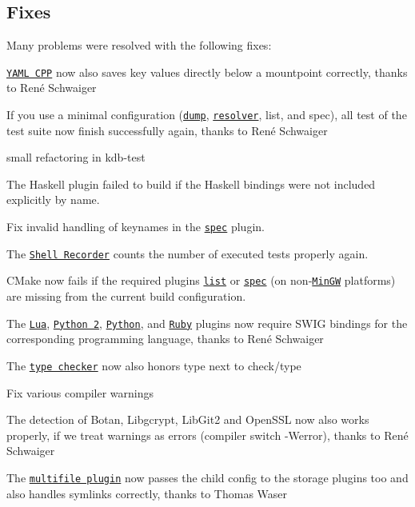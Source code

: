 \subsection*{Fixes}

Many problems were resolved with the following fixes\+:


\begin{DoxyItemize}
\item \href{http://libelektra.org/plugins/yamlcpp}{\tt Y\+A\+ML C\+PP} now also saves key values directly below a mountpoint correctly, thanks to René Schwaiger
\item If you use a minimal configuration (\href{http://libelektra.org/plugins/dump}{\tt {\ttfamily dump}}, \href{https://www.libelektra.org/plugins/resolver}{\tt {\ttfamily resolver}}, list, and spec), all test of the test suite now finish successfully again, thanks to René Schwaiger
\item small refactoring in {\ttfamily kdb-\/test}
\item The Haskell plugin failed to build if the Haskell bindings were not included explicitly by name.
\item Fix invalid handling of keynames in the \href{http://libelektra.org/plugins/spec}{\tt spec} plugin.
\item The \href{https://master.libelektra.org/tests/shell/shell_recorder}{\tt Shell Recorder} counts the number of executed tests properly again.
\item C\+Make now fails if the required plugins \href{http://libelektra.org/plugins/list}{\tt list} or \href{http://libelektra.org/plugins/spec}{\tt spec} (on non-\/\href{http://mingw.org}{\tt Min\+GW} platforms) are missing from the current build configuration.
\item The \href{http://libelektra.org/plugins/lua}{\tt Lua}, \href{http://libelektra.org/plugins/python2}{\tt Python 2}, \href{http://libelektra.org/plugins/python}{\tt Python}, and \href{http://libelektra.org/plugins/ruby}{\tt Ruby} plugins now require S\+W\+IG bindings for the corresponding programming language, thanks to René Schwaiger
\item The \href{https://www.libelektra.org/plugins/type}{\tt type checker} now also honors {\ttfamily type} next to {\ttfamily check/type}
\item Fix various compiler warnings
\item The detection of Botan, Libgcrypt, Lib\+Git2 and Open\+S\+SL now also works properly, if we treat warnings as errors (compiler switch {\ttfamily -\/\+Werror}), thanks to René Schwaiger
\item The \href{http://libelektra.org/plugins/multifile}{\tt multifile plugin} now passes the child config to the storage plugins too and also handles symlinks correctly, thanks to Thomas Waser
\end{DoxyItemize}

